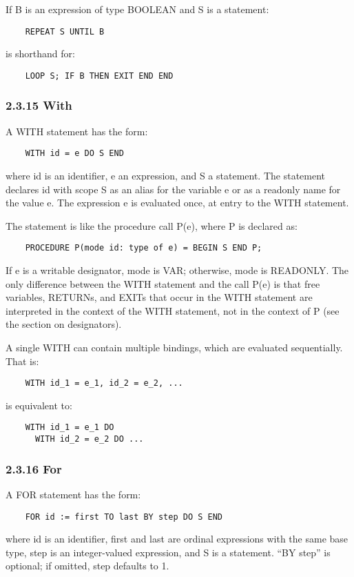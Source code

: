 \documentclass[10pt]{article}
\begin{document}
If B is an expression of type BOOLEAN and S is a statement:
\begin{verbatim}
    REPEAT S UNTIL B
\end{verbatim}
is shorthand for:
\begin{verbatim}
    LOOP S; IF B THEN EXIT END END
\end{verbatim}

\subsubsection*{2.3.15 With}

A WITH statement has the form:
\begin{verbatim}
    WITH id = e DO S END
\end{verbatim}
where id is an identifier, e an expression, and S a statement.  The statement
declares id with scope S as an alias for the variable e or as a readonly name
for the value e.  The expression e is evaluated once, at entry to the WITH
statement.

The statement is like the procedure call P(e), where P is declared as:
\begin{verbatim}
    PROCEDURE P(mode id: type of e) = BEGIN S END P;
\end{verbatim}
If e is a writable designator, mode is VAR; otherwise, mode is READONLY.  The
only difference between the WITH statement and the call P(e) is that free
variables, RETURNs, and EXITs that occur in the WITH statement are interpreted
in the context of the WITH statement, not in the context of P (see the section
on designators).

A single WITH can contain multiple bindings, which are evaluated sequentially.
That is:
\begin{verbatim}
    WITH id_1 = e_1, id_2 = e_2, ...
\end{verbatim}
is equivalent to:
\begin{verbatim}
    WITH id_1 = e_1 DO
      WITH id_2 = e_2 DO ...
\end{verbatim}

\subsubsection*{2.3.16 For}

A FOR statement has the form:
\begin{verbatim}
    FOR id := first TO last BY step DO S END
\end{verbatim}
where id is an identifier, first and last are ordinal expressions with the
same base type, step is an integer-valued expression, and S is a statement.
``BY step'' is optional; if omitted, step defaults to 1.
\end{document}
